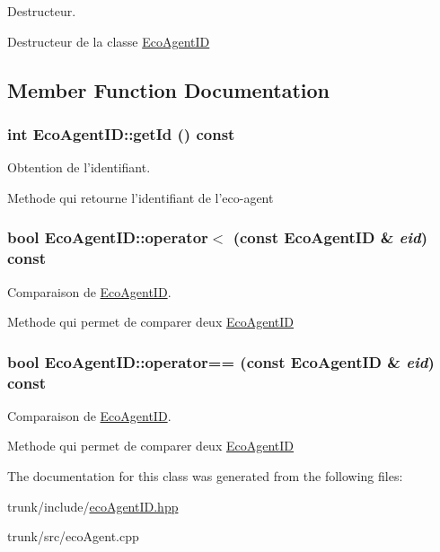 Destructeur. 

Destructeur de la classe \hyperlink{classEcoAgentID}{EcoAgentID} 

\subsection{Member Function Documentation}
\hypertarget{classEcoAgentID_30abc8a92bd07523b8e4f4baf312b56e}{
\subsubsection[{getId}]{\setlength{\rightskip}{0pt plus 5cm}int EcoAgentID::getId () const}}
\label{classEcoAgentID_30abc8a92bd07523b8e4f4baf312b56e}


Obtention de l'identifiant. 

Methode qui retourne l'identifiant de l'eco-agent \hypertarget{classEcoAgentID_24d44b31302cd2761ffce1df8f74f12c}{
\subsubsection[{operator$<$}]{\setlength{\rightskip}{0pt plus 5cm}bool EcoAgentID::operator$<$ (const {\bf EcoAgentID} \& {\em eid}) const}}
\label{classEcoAgentID_24d44b31302cd2761ffce1df8f74f12c}


Comparaison de \hyperlink{classEcoAgentID}{EcoAgentID}. 

Methode qui permet de comparer deux \hyperlink{classEcoAgentID}{EcoAgentID} \hypertarget{classEcoAgentID_a6c183361e0ccdab9da2c6666d77c111}{
\subsubsection[{operator==}]{\setlength{\rightskip}{0pt plus 5cm}bool EcoAgentID::operator== (const {\bf EcoAgentID} \& {\em eid}) const}}
\label{classEcoAgentID_a6c183361e0ccdab9da2c6666d77c111}


Comparaison de \hyperlink{classEcoAgentID}{EcoAgentID}. 

Methode qui permet de comparer deux \hyperlink{classEcoAgentID}{EcoAgentID} 

The documentation for this class was generated from the following files:\begin{CompactItemize}
\item 
trunk/include/\hyperlink{ecoAgentID_8hpp}{ecoAgentID.hpp}\item 
trunk/src/ecoAgent.cpp\end{CompactItemize}
